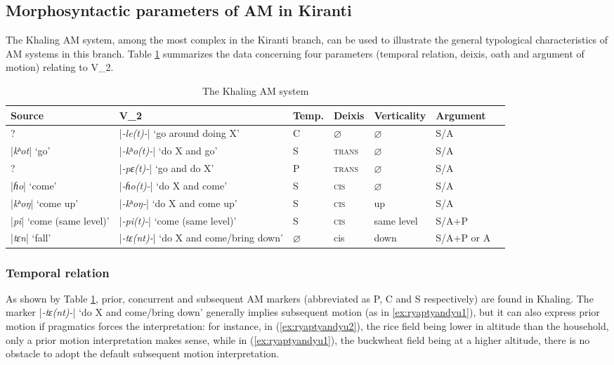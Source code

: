 \documentclass[oneside,a4paper,11pt]{article}
\newcommand{\ipa}[1]{{\phon\textit{#1}}}
\newcommand{\dhatu}[2]{|\ipa{#1}| `#2'}
\begin{document}
\subsection{Morphosyntactic parameters of AM in Kiranti}
The Khaling AM system, among the most complex in the Kiranti branch, can be used to illustrate the general typological characteristics of AM systems in this branch. Table \ref{tab:system} summarizes the data concerning four parameters (temporal relation, deixis, oath and argument of motion) relating to V_2.
\begin{landscape}
\begin{table}%
\caption{The Khaling AM system} \label{tab:system} \centering
\begin{tabular}{lllllll}
\toprule
Source &V_2 & Temp.& Deixis & Verticality & Argument \\
\midrule
?& \dhatu{-le(t)-}{go around doing X} &C& $\varnothing$ & $\varnothing$ & S/A \\
\dhatu{kʰot}{go} &\dhatu{-kʰo(t)-}{do X and go} &S& \textsc{trans} & $\varnothing$ & S/A \\
?&\dhatu{-pɛ(t)-}{go and do X} &P& \textsc{trans} & $\varnothing$ & S/A \\
\dhatu{ɦo}{come} &\dhatu{-ɦo(t)-}{do X and come} &S& \textsc{cis} & $\varnothing$ & S/A \\
\dhatu{kʰoŋ}{come up}&\dhatu{-kʰoŋ-}{do X and come up} &S& \textsc{cis} &up & S/A \\
 \dhatu{pi}{come (same level)}&\dhatu{-pi(t)-}{come (same level)} &S& \textsc{cis} &same level & S/A+P \\
\dhatu{tɛn}{fall} & \dhatu{-tɛ(nt)-}{do X and come/bring down} &$\varnothing$ & cis &down & S/A+P or A \\
\bottomrule
\end{tabular}
\end{table}
\end{landscape}
 \subsubsection{Temporal relation} \label{sec:temporal.khaling}
As shown by Table \ref{tab:system}, prior, concurrent and subsequent AM markers (abbreviated as P, C and S respectively) are found in Khaling. The marker  \dhatu{-tɛ(nt)-}{do X and come/bring down} generally implies subsequent motion (as in \ref{ex:ryaptyandyu1}), but it can also express prior motion if pragmatics forces the interpretation: for instance, in (\ref{ex:ryaptyandyu2}), the rice field being lower in altitude than the household, only a prior motion interpretation makes sense, while in (\ref{ex:ryaptyandyu1}), the buckwheat field being at a higher altitude, there is no obstacle to adopt the default subsequent motion interpretation.
\end{document}
